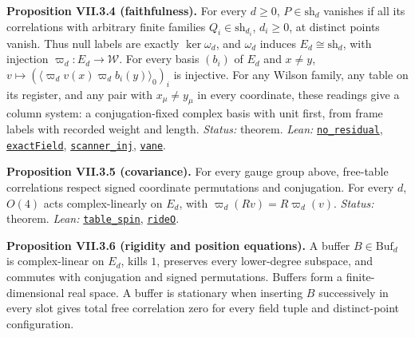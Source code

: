\documentclass[
  letterpaper,
  11pt]{article}
\begin{document}
\textbf{Proposition VII.3.4 (faithfulness).} For every \(d\ge0\),
\(P\in\mathrm{sh}_d\) vanishes if all its correlations with arbitrary
finite families \(Q_i\in\mathrm{sh}_{d_i}\), \(d_i\ge0\), at distinct
points vanish. Thus null labels are exactly \(\ker\omega_d\), and
\(\omega_d\) induces \(E_d\cong\mathrm{sh}_d\), with injection
\(\varpi_d:E_d\to\mathcal W\). For every basis \((b_i)\) of \(E_d\) and
\(x\ne y\), \(v\mapsto(\langle\varpi_dv(x)\varpi_db_i(y)\rangle_0)_i\)
is injective. For any Wilson family, any table on its register, and any
pair with \(x_\mu\ne y_\mu\) in every coordinate, these readings give a
column system: a conjugation-fixed complex basis with unit first, from
frame labels with recorded weight and length. \emph{Status:} theorem.
\emph{Lean:}
\href{https://github.com/yang-mills-group/OpenAI-YM-20261028/blob/3456e5e75cf8d4cd558955a5c7638fba2d68f464/YM/Extra/FREE_DETECTOR_ALGEBRA/Rank.lean\#L38-L54}{\texttt{no\_residual}},
\href{https://github.com/yang-mills-group/OpenAI-YM-20261028/blob/3456e5e75cf8d4cd558955a5c7638fba2d68f464/YM/Extra/FREE_DETECTOR_ALGEBRA/Rank.lean\#L64-L65}{\texttt{exactField}},
\href{https://github.com/yang-mills-group/OpenAI-YM-20261028/blob/3456e5e75cf8d4cd558955a5c7638fba2d68f464/YM/Extra/FREE_DETECTOR_ALGEBRA/Columns.lean\#L103-L115}{\texttt{scanner\_inj}},
\href{https://github.com/yang-mills-group/OpenAI-YM-20261028/blob/3456e5e75cf8d4cd558955a5c7638fba2d68f464/YM/Extra/FREE_DETECTOR_ALGEBRA/Vane.lean\#L25-L38}{\texttt{vane}}.

\textbf{Proposition VII.3.5 (covariance).} For every gauge group above,
free-table correlations respect signed coordinate permutations and
conjugation. For every \(d\), \(O(4)\) acts complex-linearly on \(E_d\),
with \(\varpi_d(Rv)=R\varpi_d(v)\). \emph{Status:} theorem. \emph{Lean:}
\href{https://github.com/yang-mills-group/OpenAI-YM-20261028/blob/3456e5e75cf8d4cd558955a5c7638fba2d68f464/YM/Extra/FREE_DETECTOR_ALGEBRA/LabelTurn.lean\#L80-L91}{\texttt{table\_spin}},
\href{https://github.com/yang-mills-group/OpenAI-YM-20261028/blob/3456e5e75cf8d4cd558955a5c7638fba2d68f464/YM/Extra/FREE_DETECTOR_ALGEBRA/Rank.lean\#L106-L110}{\texttt{rideO}}.

\textbf{Proposition VII.3.6 (rigidity and position equations).} A buffer
\(B\in\mathrm{Buf}_d\) is complex-linear on \(E_d\), kills \(1\),
preserves every lower-degree subspace, and commutes with conjugation and
signed permutations. Buffers form a finite-dimensional real space. A
buffer is stationary when inserting \(B\) successively in every slot
gives total free correlation zero for every field tuple and
distinct-point configuration.
\end{document}

